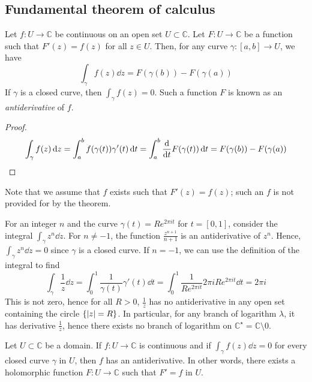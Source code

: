 \subsection{Fundamental theorem of calculus}
\begin{theorem}
	Let \( f \colon U \to \mathbb C \) be continuous on an open set \( U \subset \mathbb C \).
	Let \( F \colon U \to \mathbb C \) be a function such that \( F'(z) = f(z) \) for all \( z \in U \).
	Then, for any curve \( \gamma \colon [a,b] \to U \), we have
	\[ \int_\gamma f(z) \dd{z} = F(\gamma(b)) - F(\gamma(a)) \]
	If \( \gamma \) is a closed curve, then \( \int_\gamma f(z) = 0 \).
	Such a function \( F \) is known as an \textit{antiderivative} of \( f \).
\end{theorem}
\begin{proof}
	\[ \int_\gamma f(z) \dd{z} = \int_a^b f(\gamma(t)) \gamma'(t) \dd{t} = \int_a^b \dv{t} F(\gamma(t)) \dd{t} = F(\gamma(b)) - F(\gamma(a)) \]
\end{proof}
\begin{remark}
	Note that we assume that \( f \) exists such that \( F'(z) = f(z) \); such an \( f \) is not provided for by the theorem.
\end{remark}
\begin{example}
	For an integer \( n \) and the curve \( \gamma(t) = Re^{2\pi it} \) for \( t = [0,1] \), consider the integral \( \int_\gamma z^n \dd{z} \).
	For \( n \neq -1 \), the function \( \frac{z^{n+1}}{n+1} \) is an antiderivative of \( z^n \).
	Hence, \( \int_\gamma z^n \dd{z} = 0 \) since \( \gamma \) is a closed curve.
	If \( n = -1 \), we can use the definition of the integral to find
	\[ \int_\gamma \frac{1}{z} \dd{z} = \int_0^1 \frac{1}{\gamma(t)} \gamma'(t) \dd{t} = \int_0^1 \frac{1}{Re^{2\pi i t}}2\pi i R e^{2 \pi i t} \dd{t} = 2 \pi i \]
	This is not zero, hence for all \( R > 0 \), \( \frac{1}{z} \) has no antiderivative in any open set containing the circle \( \qty{\abs{z} = R} \).
	In particular, for any branch of logarithm \( \lambda \), it has derivative \( \frac{1}{z} \), hence there exists no branch of logarithm on \( \mathbb C^\star = \mathbb C \setminus \qty{0} \).
\end{example}
\begin{theorem}
	Let \( U \subset \mathbb C \) be a domain.
	If \( f \colon U \to \mathbb C \) is continuous and if \( \int_\gamma f(z) \dd{z} = 0 \) for every closed curve \( \gamma \) in \( U \), then \( f \) has an antiderivative.
	In other words, there exists a holomorphic function \( F \colon U \to \mathbb C \) such that \( F' = f \) in \( U \).
\end{theorem}
